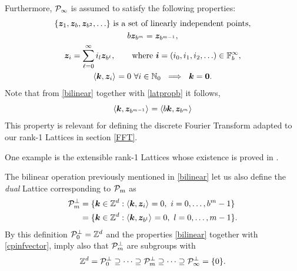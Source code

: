 \documentclass[graybox]{svmult}
\newcommand{\Z}{\mathbb{Z}} %
\newcommand{\N}{\mathbb{N}} %
\newcommand{\F}{\mathbb{F}} %
\newcommand{\bszero}{\boldsymbol{0}} %
\newcommand{\bsz}{\boldsymbol{z}}    %
\begin{document}
Furthermore, $\mathcal{P}_\infty$ is assumed to satisfy the following properties:
\begin{subequations} \label{cpinfvector}
\begin{gather}
\{\bsz_{1}, \bsz_{b}, \bsz_{b^2}, \ldots\} \text{ is a set of linearly independent points}, \\
b\bsz_{b^m}=\bsz_{b^{m-1}},\label{latpropb}\\
\bsz_i = \sum_{\ell=0}^{\infty} i_l \bsz_{b^\ell}, \qquad \text{where }\bsi=(i_0, i_1, i_2, \ldots ) \in \F_b^\infty, \label{latpropc}\\
\ip{\bsk}{\bsz_i} =  0 \ \forall i \in \N_0   \ \implies \ \bsk=\bszero. \label{latpropd}
\end{gather}
\end{subequations}
Note that from \eqref{bilinear} together with \eqref{latpropb} it follows,
\begin{equation}\label{assumgenip}
\ip{\bsk}{\bsz_{b^{m-1}}}=\ip{b\bsk}{\bsz_{b^m}}
\end{equation}
This property is relevant for defining the discrete Fourier Transform adapted to our rank-1 Lattices in section \ref{FFT}.

One example is the extensible rank-1 Lattices whose existence is proved in \cite{HicNie03a}.

The bilinear operation previously mentioned in \eqref{bilinear} let us also define the \emph{dual} Lattice corresponding to $\mathcal{P}_m$ as
\begin{align}
\nonumber
\cp^{\perp}_m &= \{\bsk \in \Z^d : \ip{\bsk}{\bsz_i} = 0, \ i=0, \ldots, b^m-1\} \\
&= \{\bsk \in \Z^d : \ip{\bsk}{\bsz_{b^{l}}} = 0, \ l=0, \ldots, m-1\}.\label{dualdef}
\end{align}
By this definition $\cp^{\perp}_{0}=\Z^d$ and the properties \eqref{bilinear} together with \eqref{cpinfvector}, imply also that $\mathcal{P}^{\perp}_m$ are subgroups with
\begin{equation}\label{dualemb}
\Z^d=\cp^{\perp}_{0}\supseteq\dots\supseteq\cp^{\perp}_{m}\supseteq\dots\supseteq\cp^{\perp}_{\infty}=\{0\}.
\end{equation}
\end{document}
